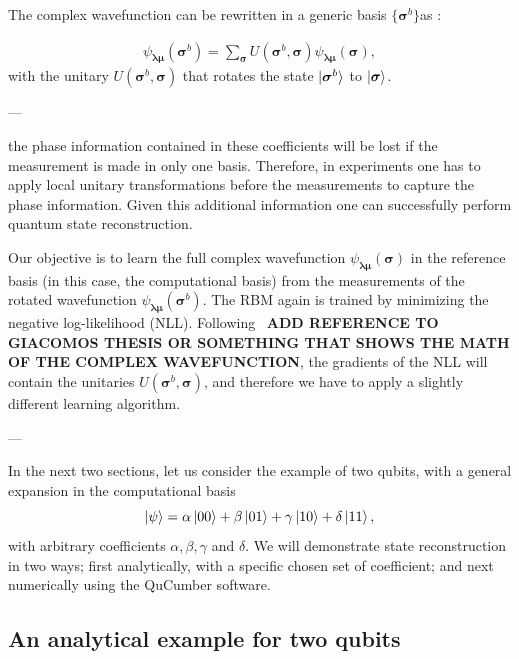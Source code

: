 \documentclass[submission, Phys]{SciPost}
\begin{document}
The complex wavefunction can be rewritten in a generic basis $\{ \bm{\sigma}^b \}$as :

\begin{align}
	\psi_{\bm{\lambda} \bm{\mu}} (\bm{\sigma}^b)= \sum_{\bm{\sigma}} U (\bm{\sigma}^b, \bm{\sigma}) \psi_{\bm{\lambda} \bm{\mu}} (\bm{\sigma}),
\end{align}
%
with the unitary $U (\bm{\sigma}^b, \bm{\sigma})$ that rotates the state $\ket{\bm{\sigma}^b}$ to $\ket{\bm{\sigma}}$.

---

the phase information contained in these coefficients will be lost if the measurement
is made in only one basis. 
Therefore, in experiments one has to apply local unitary transformations before the measurements
to capture the phase information. Given this additional information one can successfully perform quantum state reconstruction.


Our objective is to learn the full complex wavefunction $\psi_{\bm{\lambda} \bm{\mu}} (\bm{\sigma})$ in the reference basis (in this case, the computational basis) from the measurements of the rotated wavefunction $\psi_{\bm{\lambda} \bm{\mu}} (\bm{\sigma}^b)$.
The RBM again is trained by minimizing the negative log-likelihood (NLL). Following~\cite{} \textbf{ADD REFERENCE TO GIACOMOS THESIS OR SOMETHING THAT SHOWS THE MATH OF THE COMPLEX WAVEFUNCTION}, the gradients of the NLL will contain the unitaries $U (\bm{\sigma}^b, \bm{\sigma})$, and therefore we have to apply a slightly different learning algorithm.

---

In the next two sections, let us consider the example of two qubits, with a general expansion in the computational basis
\begin{equation}
\ket{\psi} = \alpha  \ket{00} + \beta  \ket{01} + \gamma  \ket{10} + \delta \ket{11},
\end{equation}
with arbitrary coefficients $\alpha, \beta, \gamma$ and $\delta$.  We will demonstrate state reconstruction in two ways; first analytically, with a specific chosen set of coefficient; and next numerically using the QuCumber software.

\subsection{An analytical example for two qubits}
\end{document}
